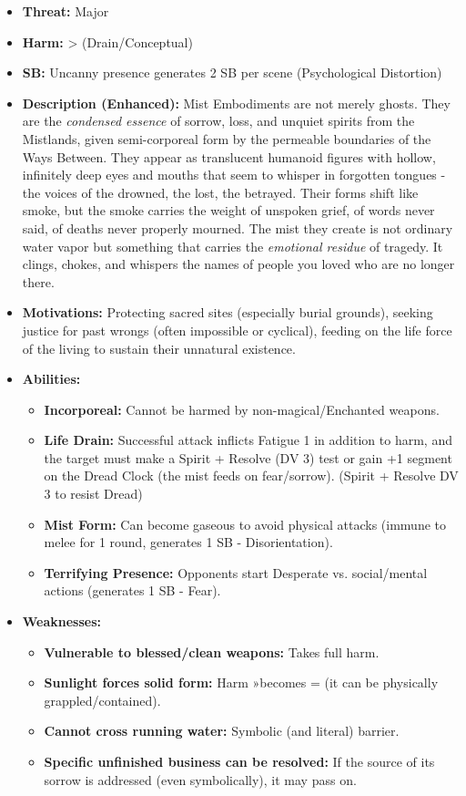 \documentclass[11pt]{article}
\begin{document}
\begin{itemize}
\item \textbf{Threat:} Major
\item \textbf{Harm:} > (Drain/Conceptual)
\item \textbf{SB:} Uncanny presence generates 2 SB per scene (Psychological Distortion)
\item \textbf{Description (Enhanced):} Mist Embodiments are not merely ghosts. They are the \textit{condensed essence} of sorrow, loss, and unquiet spirits from the Mistlands, given semi-corporeal form by the permeable boundaries of the Ways Between. They appear as translucent humanoid figures with hollow, infinitely deep eyes and mouths that seem to whisper in forgotten tongues - the voices of the drowned, the lost, the betrayed. Their forms shift like smoke, but the smoke carries the weight of unspoken grief, of words never said, of deaths never properly mourned. The mist they create is not ordinary water vapor but something that carries the \textit{emotional residue} of tragedy. It clings, chokes, and whispers the names of people you loved who are no longer there.
\item \textbf{Motivations:} Protecting sacred sites (especially burial grounds), seeking justice for past wrongs (often impossible or cyclical), feeding on the life force of the living to sustain their unnatural existence.
\item \textbf{Abilities:}
\begin{itemize}
\item \textbf{Incorporeal:} Cannot be harmed by non-magical/Enchanted weapons.
\item \textbf{Life Drain:} Successful attack inflicts Fatigue 1 in addition to harm, and the target must make a Spirit + Resolve (DV 3) test or gain +1 segment on the Dread Clock (the mist feeds on fear/sorrow). (Spirit + Resolve DV 3 to resist Dread)
\item \textbf{Mist Form:} Can become gaseous to avoid physical attacks (immune to melee for 1 round, generates 1 SB - Disorientation).
\item \textbf{Terrifying Presence:} Opponents start Desperate vs. social/mental actions (generates 1 SB - Fear).
\end{itemize}
\item \textbf{Weaknesses:}
\begin{itemize}
\item \textbf{Vulnerable to blessed/clean weapons:} Takes full harm.
\item \textbf{Sunlight forces solid form:} Harm »becomes = (it can be physically grappled/contained).
\item \textbf{Cannot cross running water:} Symbolic (and literal) barrier.
\item \textbf{Specific unfinished business can be resolved:} If the source of its sorrow is addressed (even symbolically), it may pass on.
\end{itemize}
\end{itemize}
\end{document}
